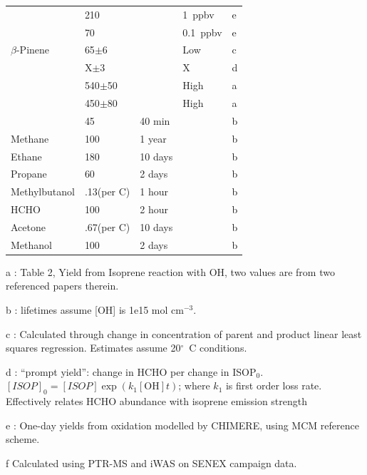 \begin{table}
\begin{threeparttable}
\begin{tabular}{  l  l  l  l  l  }
            & 210             &        & 1~ppbv        & e        \\
            & 70              &        & 0.1~ppbv      & e        \\
            $\beta$-Pinene  & 65$\pm$6        &        & Low           & c      \\ 
            & X$\pm$3         &        & X             & d      \\ 
            & 540$\pm$50      &        & High          & a     \\ 
            & 450$\pm$80      &        & High          & a      \\ 
            & 45              & 40 min &              & b      \\ %
            Methane 	      & 100             & 1 year  &             & b     \\ 
            Ethane          & 180             & 10 days &             & b     \\ 
            Propane         & 60              & 2 days  &             & b     \\ 
            Methylbutanol   & .13(per C)    & 1 hour  &             & b     \\ 
            HCHO            & 100             & 2 hour  &             & b     \\ 
            Acetone         & .67(per C)      & 10 days &             & b     \\ 
            Methanol        & 100             & 2 days  &             & b     \\ %
            \bottomrule
          \end{tabular}
          \begin{tablenotes} %
            \item a \textcite{AtkinsonArey2003}: Table 2, Yield from Isoprene reaction with OH, two values are from two referenced papers therein.
            \item b \textcite{Palmer2003}: lifetimes assume [OH] is 1e15 mol cm$^{-3}$.
            \item c \parencite{Lee2006}: Calculated through change in concentration of parent and product linear least squares regression.
            Estimates assume 20$^\circ$~C conditions.
            \item d \textcite{Wolfe2016}: ``prompt yield'': change in HCHO per change in ISOP$_0$.
            $[ISOP]_0=[ISOP]\exp(k_1[\mathrm{OH}]t)$; where $k_1$ is first order loss rate.
            Effectively relates HCHO abundance with isoprene emission strength
            \item e \textcite{Dufour2009}: One-day yields from oxidation modelled by CHIMERE, using MCM reference scheme.
            \item f Calculated using PTR-MS and iWAS on SENEX campaign data.
          \end{tablenotes}
          \label{BioIsop:Method:tab_VOCLiteratureYields}
        \end{threeparttable} \end{table}
        
